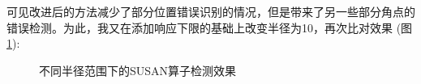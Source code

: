 \documentclass[a4paper,11pt,UTF8]{ctexart}
\begin{document}
可见改进后的方法减少了部分位置错误识别的情况，但是带来了另一些部分角点的错误检测。为此，我又在添加响应下限的基础上改变半径为10，再次比对效果 (图\ref{susan_obj_2}):
\begin{figure}[htbp]
    \centering  %
    

    \caption{不同半径范围下的SUSAN算子检测效果}    %
    \label{susan_obj_2}    %
\end{figure}
\end{document}
